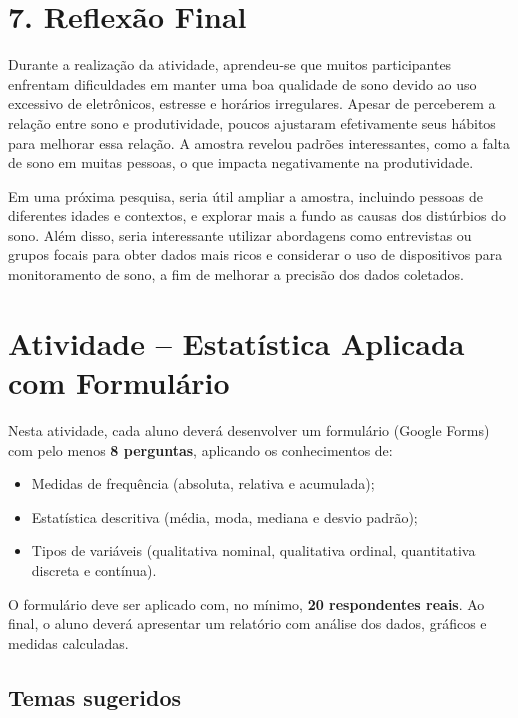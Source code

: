 \documentclass[12pt,a4paper]{article}
\begin{document}
\section*{7. Reflexão Final}
Durante a realização da atividade, aprendeu-se que muitos participantes enfrentam dificuldades em manter uma boa qualidade de sono devido ao uso excessivo de eletrônicos, estresse e horários irregulares. Apesar de perceberem a relação entre sono e produtividade, poucos ajustaram efetivamente seus hábitos para melhorar essa relação. A amostra revelou padrões interessantes, como a falta de sono em muitas pessoas, o que impacta negativamente na produtividade.

Em uma próxima pesquisa, seria útil ampliar a amostra, incluindo pessoas de diferentes idades e contextos, e explorar mais a fundo as causas dos distúrbios do sono. Além disso, seria interessante utilizar abordagens como entrevistas ou grupos focais para obter dados mais ricos e considerar o uso de dispositivos para monitoramento de sono, a fim de melhorar a precisão dos dados coletados.



\hfill
\vspace{1cm}
\section*{Atividade – Estatística Aplicada com Formulário}

Nesta atividade, cada aluno deverá desenvolver um formulário (Google Forms) com pelo menos \textbf{8 perguntas}, aplicando os conhecimentos de:

\begin{itemize}
    \item Medidas de frequência (absoluta, relativa e acumulada);
    \item Estatística descritiva (média, moda, mediana e desvio padrão);
    \item Tipos de variáveis (qualitativa nominal, qualitativa ordinal, quantitativa discreta e contínua).
\end{itemize}

O formulário deve ser aplicado com, no mínimo, \textbf{20 respondentes reais}. Ao final, o aluno deverá apresentar um relatório com análise dos dados, gráficos e medidas calculadas.

\subsection*{Temas sugeridos}
\end{document}
